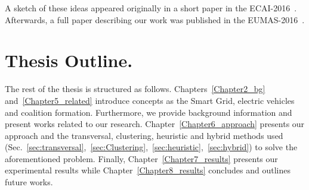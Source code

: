 A sketch of these ideas appeared originally in a short paper in the ECAI-2016~\cite{christianos2016_short}. Afterwards, a full paper describing our work was published in the EUMAS-2016~\cite{christianos2016_full}.
\section{Thesis Outline.}
The rest of the thesis is structured as follows. Chapters~\ref{Chapter2_bg} and~\ref{Chapter5_related} introduce concepts as the Smart Grid, electric vehicles and coalition formation. Furthermore, we provide background information and present works related to our research. Chapter~\ref{Chapter6_approach} presents our approach and the transversal, clustering, heuristic and hybrid methods used (Sec.~\ref{sec:transversal},~\ref{sec:Clustering},~\ref{sec:heuristic},~\ref{sec:hybrid}) to solve the aforementioned problem. Finally, Chapter~\ref{Chapter7_results} presents our experimental results while Chapter~\ref{Chapter8_results} concludes and outlines future works. 





